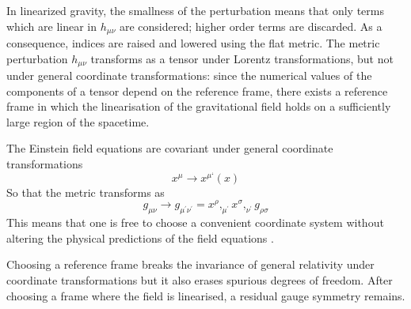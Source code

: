 \documentclass[binding=0.6cm, LaM]{sapthesis}
\begin{document}
	In linearized gravity, the smallness of the perturbation means that only terms which are linear in $h_{\mu\nu}$ are considered;
	higher order terms are discarded. As a consequence, indices are raised and lowered using the flat metric. 
	The metric perturbation $h_{\mu\nu}$ transforms as a tensor under Lorentz transformations, 
	but not under general coordinate transformations: since the numerical values of the components
	of a tensor depend on the reference frame, there exists a reference frame in which 
	the linearisation of the gravitational field holds on a sufficiently large region of the spacetime.
        
	The Einstein field equations are covariant under general coordinate transformations
		\begin{equation}
		x^{\mu} \rightarrow x^{\mu ‘}(x)
		\end{equation}
	So that the metric transforms as
		\begin{equation}
		g_{\mu\nu} \rightarrow g_{\mu^\prime\nu^\prime} = x^{\rho},_{\mu^\prime}x^{\sigma},_{\nu^\prime}g_{\rho \sigma}
		\end{equation}
	This means that one is free to choose a convenient coordinate system without 
	altering the physical predictions of the field equations \cite{16}.

	Choosing a reference frame breaks the invariance of general relativity under 
	coordinate transformations but it also erases spurious degrees of freedom. 
	After choosing a frame where the field is linearised, 
	a residual gauge symmetry remains.
\end{document}
